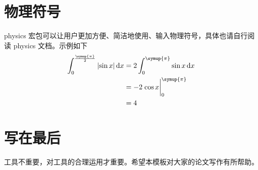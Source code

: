 \section{物理符号}
physics 宏包可以让用户更加方便、简洁地使用、输入物理符号，具体也请自行阅读 physics 文档。示例如下
\begin{equation}
  \begin{aligned}
    \int_0^\frac{\symup{\pi}}{2} \abs{\sin{x}} \dd{x} & = 2 \int_0^{\symup{\pi}} \sin{x} \dd{x} \\
                                                      & = -2 \eval{\cos{x}}_0^{\symup{\pi}}     \\
                                                      & = 4
  \end{aligned}
\end{equation}

\section{写在最后}
工具不重要，对工具的合理运用才重要。希望本模板对大家的论文写作有所帮助。

